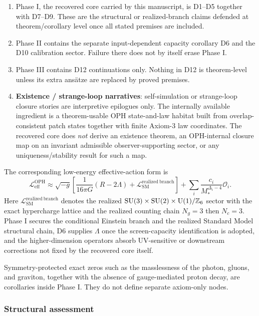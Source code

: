 \begin{enumerate}
\def\labelenumi{\arabic{enumi}.}
\item
Phase I, the recovered core carried by this manuscript, is D1--D5 together with D7--D9. These are the structural or realized-branch claims defended at theorem/corollary level once all stated premises are included.
\item
Phase II contains the separate input-dependent capacity corollary D6 and the D10 calibration sector. Failure there does not by itself erase Phase I.
\item
Phase III contains D12 continuations only. Nothing in D12 is theorem-level unless its extra ans\"atze are replaced by proved premises.
\item \textbf{Existence / strange-loop narratives}: self-simulation or strange-loop closure stories are interpretive epilogues only. The internally available ingredient is a theorem-usable OPH state-and-law habitat built from overlap-consistent patch states together with finite Axiom-3 law coordinates. The recovered core does \emph{not} derive an existence theorem, an OPH-internal closure map on an invariant admissible observer-supporting sector, or any uniqueness/stability result for such a map.
\end{enumerate}

The corresponding low-energy effective-action form is
\[
\mathcal L_{\mathrm{eff}}^{\mathrm{OPH}}
\approx
\sqrt{-g}\left[
\frac{1}{16\pi G}(R-2\Lambda)
+
\mathcal L_{\mathrm{SM}}^{\mathrm{realized\ branch}}
\right]
+
\sum_i \frac{c_i}{M_*^{\Delta_i-4}}\mathcal O_i.
\]
Here \(\mathcal L_{\mathrm{SM}}^{\mathrm{realized\ branch}}\) denotes the realized \(\mathrm{SU}(3)\times\mathrm{SU}(2)\times\mathrm{U}(1)/\mathbb Z_6\) sector with the exact hypercharge lattice and the realized counting chain \(N_g=3\) then \(N_c=3\). Phase I secures the conditional Einstein branch and the realized Standard Model structural chain, D6 supplies \(\Lambda\) once the screen-capacity identification is adopted, and the higher-dimension operators absorb UV-sensitive or downstream corrections not fixed by the recovered core itself.

Symmetry-protected exact zeros such as the masslessness of the photon, gluons, and graviton, together with the absence of gauge-mediated proton decay, are corollaries inside Phase I. They do not define separate axiom-only nodes.
\subsubsection{Structural assessment}\label{82-structural-assessment}

